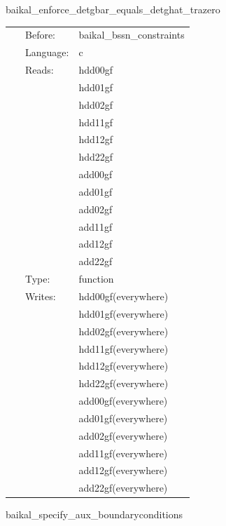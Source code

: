 \hspace{5mm} baikal\_enforce\_detgbar\_equals\_detghat\_trazero 

\hspace{5mm}{\it project bssn/fccz4 state before pseudo-evolution routines } 


\hspace{5mm}

 \begin{tabular*}{160mm}{cll} 
~ & Before:  & baikal\_bssn\_constraints \\ 
~ & Language:  & c \\ 
~ & Reads:  & hdd00gf \\ 
~& ~ &hdd01gf\\ 
~& ~ &hdd02gf\\ 
~& ~ &hdd11gf\\ 
~& ~ &hdd12gf\\ 
~& ~ &hdd22gf\\ 
~& ~ &add00gf\\ 
~& ~ &add01gf\\ 
~& ~ &add02gf\\ 
~& ~ &add11gf\\ 
~& ~ &add12gf\\ 
~& ~ &add22gf\\ 
~ & Type:  & function \\ 
~ & Writes:  & hdd00gf(everywhere) \\ 
~& ~ &hdd01gf(everywhere)\\ 
~& ~ &hdd02gf(everywhere)\\ 
~& ~ &hdd11gf(everywhere)\\ 
~& ~ &hdd12gf(everywhere)\\ 
~& ~ &hdd22gf(everywhere)\\ 
~& ~ &add00gf(everywhere)\\ 
~& ~ &add01gf(everywhere)\\ 
~& ~ &add02gf(everywhere)\\ 
~& ~ &add11gf(everywhere)\\ 
~& ~ &add12gf(everywhere)\\ 
~& ~ &add22gf(everywhere)\\ 
\end{tabular*} 


\vspace{5mm}


\hspace{5mm} baikal\_specify\_aux\_boundaryconditions 

